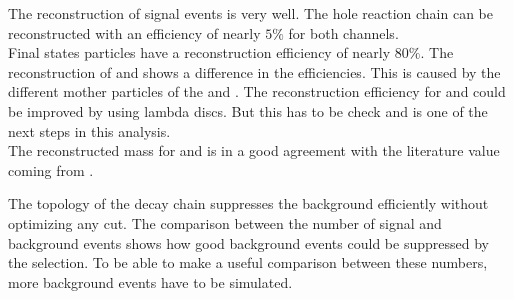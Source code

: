 The reconstruction of signal events is very well.
The hole reaction chain can be reconstructed with an efficiency of nearly $5\%$ for both channels.\\
Final states particles have a reconstruction efficiency of nearly $80\%$.
The reconstruction of \lam and \alam shows a difference in the efficiencies.
This is caused by the different mother particles of the \lam and \alam. 
The reconstruction efficiency for \lam and \alam could be improved by using lambda discs.
But this has to be check and is one of the next steps in this analysis.\\
The reconstructed mass for \excitedcascade and \excitedanticascade is in a good agreement with the literature value coming from \cite{PDG}.

The topology of the decay chain suppresses the background efficiently without optimizing any cut.
The comparison between the number of signal and background events shows how good background events could be suppressed by the selection.
To be able to make a useful comparison between these numbers, more background events have to be simulated.
 
  


